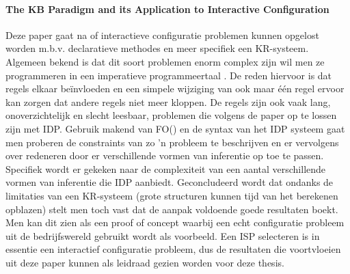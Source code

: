 \paragraph{The KB Paradigm and its Application to Interactive Configuration \cite{van2016kb}}
Deze paper gaat na of interactieve configuratie problemen kunnen opgelost worden m.b.v. declaratieve methodes en meer specifiek een KR-systeem. Algemeen bekend is dat dit soort problemen enorm complex zijn wil men ze programmeren in een imperatieve programmeertaal \cite{gelle1996interactive}. De reden hiervoor is dat regels elkaar be\"{i}nvloeden en een simpele wijziging van ook maar \'{e}\'{e}n regel ervoor kan zorgen dat andere regels niet meer kloppen. De regels zijn ook vaak lang, onoverzichtelijk en slecht leesbaar, problemen die volgens de paper op te lossen zijn met IDP. Gebruik makend van FO(\textperiodcentered) en de syntax van het IDP systeem gaat men proberen de constraints van zo 'n probleem te beschrijven en er vervolgens over redeneren door er verschillende vormen van inferentie op toe te passen. Specifiek wordt er gekeken naar de complexiteit van een aantal verschillende vormen van inferentie die IDP aanbiedt. Geconcludeerd wordt dat ondanks de limitaties van een KR-systeem (grote structuren kunnen tijd van het berekenen opblazen) stelt men toch vast dat de aanpak voldoende goede resultaten boekt. Men kan dit zien als een proof of concept waarbij een echt configuratie probleem uit de bedrijfswereld gebruikt wordt als voorbeeld. Een ISP selecteren is in essentie een interactief configuratie probleem, dus de resultaten die voortvloeien uit deze paper kunnen als leidraad gezien worden voor deze thesis.

